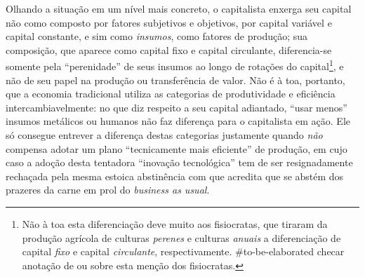 Olhando a situação em um nível mais concreto, o capitalista enxerga seu capital não como composto por fatores subjetivos e objetivos, por capital variável e capital constante, e sim como \textit{insumos}, como fatores de produção; sua composição, que aparece como capital fixo e capital circulante, diferencia-se somente pela ``perenidade'' de seus insumos ao longo de rotações do capital\footnote{Não à toa esta diferenciação deve muito aos fisiocratas, que tiraram da produção agrícola de culturas \textit{perenes} e culturas \textit{anuais} a diferenciação de capital \textit{fixo} e capital \textit{circulante}, respectivamente. \#to-be-elaborated checar anotação de \textcite{Marx2014} ou \textcite{Marx2017a} sobre esta menção dos fisiocratas.}, e não de seu papel na produção ou transferência de valor. Não é à toa, portanto, que a economia tradicional utiliza as categorias de produtividade e eficiência intercambiavelmente: no que diz respeito a seu capital adiantado, ``usar menos'' insumos metálicos ou humanos não faz diferença para o capitalista em ação. Ele só consegue entrever a diferença destas categorias justamente quando \textit{não} compensa adotar um plano ``tecnicamente mais eficiente'' de produção, em cujo caso a adoção desta tentadora ``inovação tecnológica'' tem de ser resignadamente rechaçada pela mesma estoica abstinência com que acredita que se abstém dos prazeres da carne em prol do \textit{business as usual}.